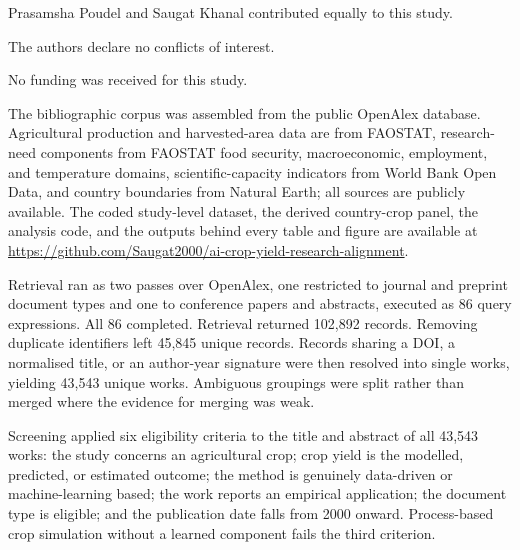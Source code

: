 \documentclass[ASNA,twocolumn]{USG}
\makeatletter
\newcommand{\applabel}[2]{\phantomsection\edef\@currentlabel{#1}\label{#2}}
\makeatother
\begin{document}

Prasamsha Poudel and Saugat Khanal contributed equally to this study.


The authors declare no conflicts of interest.


No funding was received for this study.


The bibliographic corpus was assembled from the public OpenAlex database. Agricultural production and harvested-area data are from FAOSTAT, research-need components from FAOSTAT food security, macroeconomic, employment, and temperature domains, scientific-capacity indicators from World Bank Open Data, and country boundaries from Natural Earth; all sources are publicly available. The coded study-level dataset, the derived country-crop panel, the analysis code, and the outputs behind every table and figure are available at \url{https://github.com/Saugat2000/ai-crop-yield-research-alignment}.



\appendix
\renewcommand{\thetable}{A\arabic{table}}
\renewcommand{\thefigure}{A\arabic{figure}}

\renewcommand{\thesection}{Appendix \Alph{section}}
\renewcommand{\thetable}{A\arabic{table}}

\applabel{Appendix A}{app:corpus}

Retrieval ran as two passes over OpenAlex, one restricted to journal and preprint document
types and one to conference papers and abstracts, executed as 86 query expressions. All 86
completed. Retrieval returned 102,892 records. Removing duplicate identifiers left 45,845
unique records. Records sharing a DOI, a normalised title, or an author-year signature were
then resolved into single works, yielding 43,543 unique works. Ambiguous groupings were
split rather than merged where the evidence for merging was weak.

Screening applied six eligibility criteria to the title and abstract of all 43,543 works: the
study concerns an agricultural crop; crop yield is the modelled, predicted, or estimated
outcome; the method is genuinely data-driven or machine-learning based; the work reports an
empirical application; the document type is eligible; and the publication date falls from
2000 onward. Process-based crop simulation without a learned component fails the third
criterion.
\end{document}
